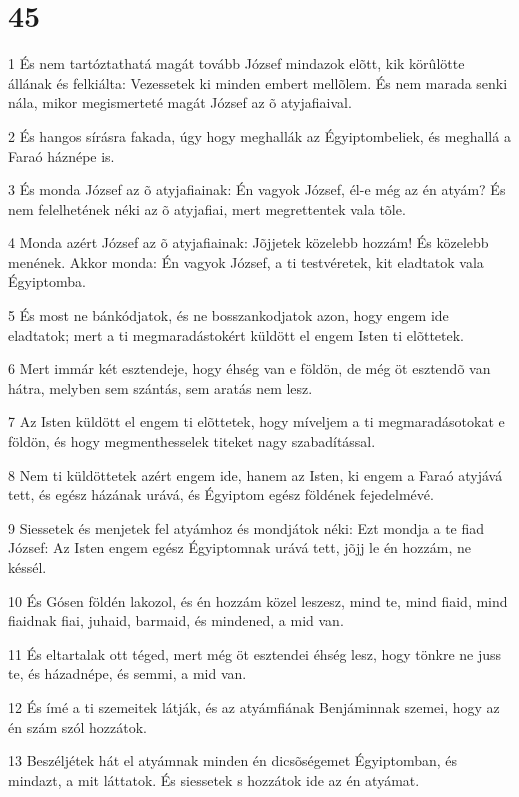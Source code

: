 \chapter{45}

\par 1 És nem tartóztathatá magát tovább József mindazok elõtt, kik körûlötte állának és felkiálta: Vezessetek ki minden embert mellõlem. És nem marada senki nála, mikor megismerteté magát József az õ atyjafiaival.
\par 2 És hangos sírásra fakada, úgy hogy meghallák az Égyiptombeliek, és meghallá a Faraó háznépe is.
\par 3 És monda József az õ atyjafiainak: Én vagyok József, él-e még az én atyám? És nem felelhetének néki az õ atyjafiai, mert megrettentek vala tõle.
\par 4 Monda azért József az õ atyjafiainak: Jõjjetek közelebb hozzám! És közelebb menének. Akkor monda: Én vagyok József, a ti testvéretek, kit eladtatok vala Égyiptomba.
\par 5 És most ne bánkódjatok, és ne bosszankodjatok azon, hogy engem ide eladtatok; mert a ti megmaradástokért küldött el engem Isten ti elõttetek.
\par 6 Mert immár két esztendeje, hogy éhség van e földön, de még öt esztendõ van hátra, melyben sem szántás, sem aratás nem lesz.
\par 7 Az Isten küldött el engem ti elõttetek, hogy míveljem a ti megmaradásotokat e földön, és hogy megmenthesselek titeket nagy szabadítással.
\par 8 Nem ti küldöttetek azért engem ide, hanem az Isten, ki engem a Faraó atyjává tett, és egész házának urává, és Égyiptom egész földének fejedelmévé.
\par 9 Siessetek és menjetek fel atyámhoz és mondjátok néki: Ezt mondja a te fiad József: Az Isten engem egész Égyiptomnak urává tett, jõjj le én hozzám, ne késsél.
\par 10 És Gósen földén lakozol, és én hozzám közel leszesz, mind te, mind fiaid, mind fiaidnak fiai, juhaid, barmaid, és mindened, a mid van.
\par 11 És eltartalak ott téged, mert még öt esztendei éhség lesz, hogy tönkre ne juss te, és házadnépe, és semmi, a mid van.
\par 12 És ímé a ti szemeitek látják, és az atyámfiának Benjáminnak szemei, hogy az én szám szól hozzátok.
\par 13 Beszéljétek hát el atyámnak minden én dicsõségemet Égyiptomban, és mindazt, a mit láttatok. És siessetek s hozzátok ide az én atyámat.
